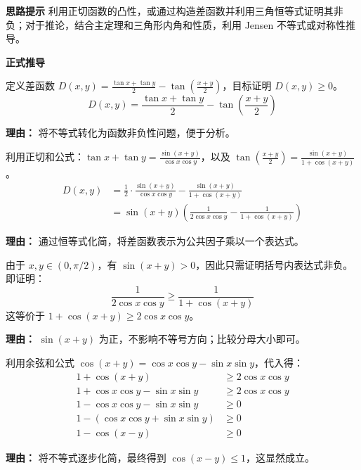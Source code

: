 \begin{proofbox}
\textbf{\textcolor{CProof}{思路提示}}
利用正切函数的凸性，或通过构造差函数并利用三角恒等式证明其非负；对于推论，结合主定理和三角形内角和性质，利用 Jensen 不等式或对称性推导。

\medskip
\textbf{\textcolor{CProof}{正式推导}}
\begin{description}[style=nextline, leftmargin=2.8em, labelsep=0.5em, itemsep=0.55em]
    \item[\textbf{步骤一（设差函数）：}] 定义差函数 $D(x,y) = \frac{\tan x + \tan y}{2} - \tan\left(\frac{x+y}{2}\right)$，目标证明 $D(x,y) \geq 0$。
    \[
    D(x,y) = \frac{\tan x + \tan y}{2} - \tan\left(\frac{x+y}{2}\right)
    \]
    \par\textbf{理由：}
    将不等式转化为函数非负性问题，便于分析。

    \item[\textbf{步骤二（三角恒等式）：}] 利用正切和公式：$\tan x + \tan y = \frac{\sin(x+y)}{\cos x \cos y}$，以及 $\tan\left(\frac{x+y}{2}\right) = \frac{\sin(x+y)}{1+\cos(x+y)}$。
    \[
    \begin{aligned}
    D(x,y) &= \frac{1}{2} \cdot \frac{\sin(x+y)}{\cos x \cos y} - \frac{\sin(x+y)}{1+\cos(x+y)} \\
    &= \sin(x+y) \left( \frac{1}{2\cos x \cos y} - \frac{1}{1+\cos(x+y)} \right)
    \end{aligned}
    \]
    \par\textbf{理由：}
    通过恒等式化简，将差函数表示为公共因子乘以一个表达式。

    \item[\textbf{步骤三（判别符号）：}] 由于 $x,y \in (0, \pi/2)$，有 $\sin(x+y) > 0$，因此只需证明括号内表达式非负。即证明：
    \[
    \frac{1}{2\cos x \cos y} \geq \frac{1}{1+\cos(x+y)}
    \]
    这等价于 $1+\cos(x+y) \geq 2\cos x \cos y$。
    \par\textbf{理由：}
    $\sin(x+y)$ 为正，不影响不等号方向；比较分母大小即可。

    \item[\textbf{步骤四（化简不等式）：}] 利用余弦和公式 $\cos(x+y) = \cos x \cos y - \sin x \sin y$，代入得：
    \[
    \begin{aligned}
    1 + \cos(x+y) &\geq 2\cos x \cos y \\
    1 + \cos x \cos y - \sin x \sin y &\geq 2\cos x \cos y \\
    1 - \cos x \cos y - \sin x \sin y &\geq 0 \\
    1 - (\cos x \cos y + \sin x \sin y) &\geq 0 \\
    1 - \cos(x-y) &\geq 0
    \end{aligned}
    \]
    \par\textbf{理由：}
    将不等式逐步化简，最终得到 $\cos(x-y) \leq 1$，这显然成立。


\end{description}
\end{proofbox}
